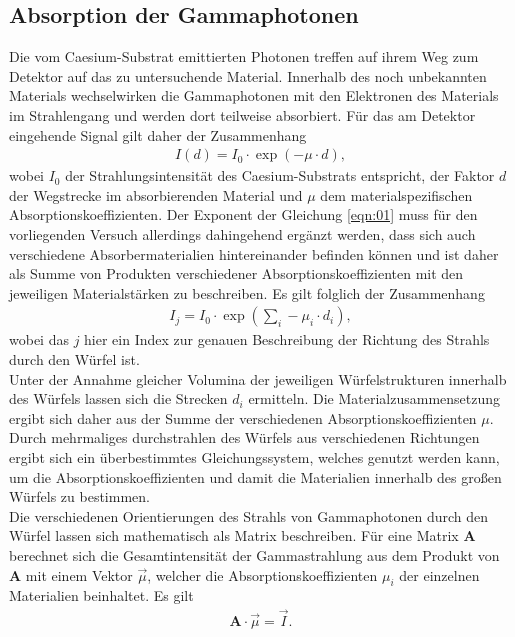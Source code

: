 \subsection{Absorption der Gammaphotonen}
Die vom Caesium-Substrat emittierten Photonen treffen auf ihrem Weg zum Detektor
auf das zu untersuchende Material. Innerhalb des noch unbekannten Materials
wechselwirken die Gammaphotonen mit den Elektronen des Materials im Strahlengang
und werden dort teilweise absorbiert. Für das am Detektor eingehende Signal gilt
daher der Zusammenhang
\begin{align}
  I(d) = I_0 \cdot \exp{(- \mu \cdot d)},
  \label{eqn:01}
\end{align}
wobei $I_0$ der Strahlungsintensität des Caesium-Substrats entspricht, der
Faktor $d$ der Wegstrecke im absorbierenden Material und $\mu$ dem
materialspezifischen Absorptionskoeffizienten. Der Exponent der Gleichung
\ref{eqn:01} muss für den vorliegenden Versuch allerdings dahingehend ergänzt
werden, dass sich auch verschiedene Absorbermaterialien hintereinander befinden
können und ist daher als Summe von Produkten verschiedener
Absorptionskoeffizienten mit den jeweiligen Materialstärken zu beschreiben. Es
gilt folglich der Zusammenhang
\begin{align}
  I_j = I_0 \cdot \exp{\left(\sum_{i} - \mu_i \cdot d_i \right)},
  \label{eqn:02}
\end{align}
\noindent wobei das $j$ hier ein Index zur genauen Beschreibung der Richtung des
Strahls durch den Würfel ist. \\
\noindent Unter der Annahme gleicher Volumina der jeweiligen Würfelstrukturen
innerhalb des Würfels lassen sich die Strecken $d_i$ ermitteln. Die
Materialzusammensetzung ergibt sich daher aus der Summe der
verschiedenen Absorptionskoeffizienten $\mu$. Durch mehrmaliges durchstrahlen
des Würfels aus verschiedenen Richtungen ergibt sich ein überbestimmtes
Gleichungssystem, welches genutzt werden kann, um die Absorptionskoeffizienten
und damit die Materialien innerhalb des großen Würfels zu bestimmen. \\
\noindent Die verschiedenen Orientierungen des Strahls von Gammaphotonen durch
den Würfel lassen sich mathematisch als Matrix beschreiben. Für eine Matrix $\textbf{A}$
berechnet sich die Gesamtintensität der Gammastrahlung aus dem Produkt von $\textbf{A}$
mit einem Vektor $\vec{\mu}$, welcher die Absorptionskoeffizienten $\mu_i$ der
einzelnen Materialien beinhaltet. Es gilt
\begin{align}
  \textbf{A} \cdot \vec{\mu} = \vec{I}.
  \label{eqn:03}
\end{align}
